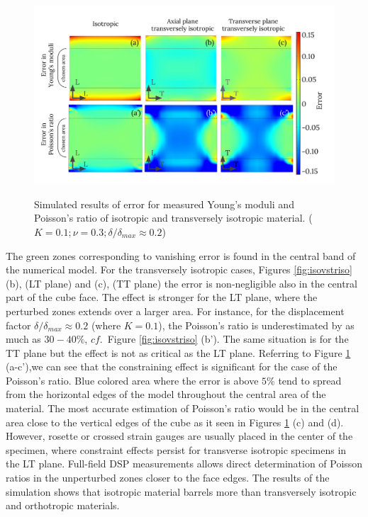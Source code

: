 \documentclass[3p]{elsarticle}
\begin{document}
\begin{figure}[h]
\centering
\includegraphics[width=\textwidth]{BarellingError.pdf}
\label{fig:Error}
\caption{\label{fig:Error} Simulated results of error for measured Young's
moduli and Poisson's ratio of isotropic and transversely isotropic
material. ($K=0.1; \nu=0.3; \delta/\delta_{max}\approx0.2$)}

\end{figure}

The green zones corresponding to vanishing error is found in the central band of
the numerical model. For the transversely isotropic cases, Figures
\ref{fig:isovstriso} (b\textprime), (LT plane) and (c\textprime), (TT plane) the error is
non-negligible also in the central part of the cube face. The effect is stronger for the LT plane, where the perturbed zones extends over a larger area.
For instance, for the displacement factor $\delta/\delta_{max}\approx0.2 $ (where $K=0.1$),  the Poisson's ratio is
underestimated by as much as $30-40\%$, $cf.$\ Figure \ref{fig:isovstriso} (b’).
The same situation is for the TT plane  but the effect is not as critical as the LT plane.
Referring to Figure \ref{fig:Error} (a\textprime-c’\textprime),we can see that
the constraining effect is significant for the case of the Poisson's ratio. Blue colored area where the error is above $5\%$ tend to spread from the horizontal edges of 
the model throughout the central area of the material. The most accurate
estimation of Poisson's ratio would be in the central area close to the vertical
edges of the cube as it seen in Figures \ref{fig:Error} (c\textprime) and
(d\textprime).
However, rosette or crossed strain gauges are usually placed in the center of the specimen, where constraint effects persist for transverse isotropic specimens in the LT plane. Full-field DSP measurements allows direct determination of Poisson ratios in the unperturbed zones closer to the face edges. 
The results of the simulation shows that isotropic material barrels more than transversely isotropic and orthotropic materials. \\	
\end{document}
